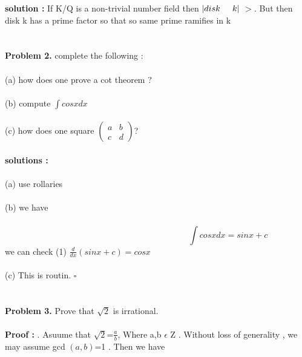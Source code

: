  \textbf{solution : }
     \Large{If K/Q is a non-trivial number field then $|disk \hspace{0.5cm} k|$ $>$. But then disk k has a prime factor so that so same prime ramifies in \huge k\\
   \hspace{10.5cm}}
     \\ \\
     \textbf{Problem 2.}  complete the following :\\ \\
     (a) \hspace{1cm} how does one prove a cot theorem ?\\ \\
     (b) \hspace{1cm} compute $\int cosx dx$\\ \\ 
     (c) \hspace{1cm} how does one square 
     $
\begin{pmatrix}
      a & b \\
      c & d 
\end{pmatrix} $? \\ \\
 \textbf{solutions : }\\ \\
  (a) use rollaries\\ \\
  (b) we have \\ \\
  \begin{equation}
   \hspace{7cm}
   \int cosx dx =sinx +c  
 \end{equation}
\hspace{1cm} we can check (1) 
  \hspace{2cm} $\frac{d}{dx} (sinx + c) = cosx$ \\ \\
 (c) This is routin. \hspace{12.5cm}$\square $ \\ \\ \\
\textbf{Problem 3.} Prove that $ \sqrt{2}$ is irrational. \\ \\
 \textbf{Proof :} . Asuume that $\sqrt{2}$=$\frac{a}{b}$, Where a,b  $\epsilon $  Z . Without loss of generality , we may assume gcd $(a,b)$=1 . Then we have \\
 
